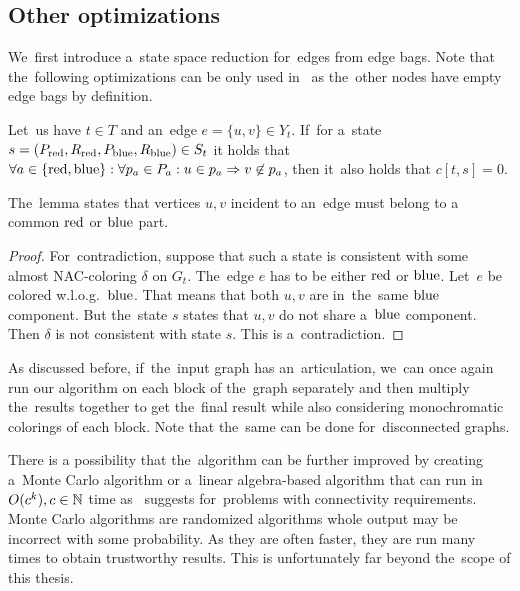 \subsection{Other optimizations}

We~first introduce a~state space reduction for~edges from edge bags.
%
Note that the~following optimizations can be only used in~\IntroduceEdgeNode{}
as the~other nodes have empty edge bags by definition.
%
\begin{lemma}
	Let~us have \( t \in T \) and an~edge \( e = \{u, v\} \in Y_t \).
	If~for a~state \( s = (P_{\text{red}}, R_{\text{red}}, P_{\text{blue}}, R_{\text{blue}}) \in S_t \)
	it holds that
	\( {\forall a \in \{\text{red}, \text{blue}\}} : {\forall p_a \in P_a} : {u \in p_a \Rightarrow v \not\in p_a} \),
	then it~also holds that \( c[t, s] = 0 \).
\end{lemma}
%
The~lemma states that vertices \( u, v \) incident to an~edge must
belong to a common \( \text{red} \) or \( \text{blue} \) part.
%
\begin{proof}
	For~contradiction, suppose that such a state is consistent
	with some almost NAC-coloring \( \delta \) on \( G_t \).
	The~edge \( e \) has to be either \( \text{red} \) or \( \text{blue} \).
	Let~\( e \) be colored w.l.o.g.\ \( \text{blue} \).
	That means that both \( u, v \) are in~the~same \( \text{blue} \) component.
	But the~state \( s \) states that \( u, v \) do not share a~\( \text{blue} \) component.
	Then \( \delta \) is not consistent with state \( s \).
	This is a~contradiction.
\end{proof}

As discussed before, if~the~input graph has an~articulation,
we~can once again run our algorithm on each block of the~graph separately
and then multiply the~results together to get the~final result
while also considering monochromatic colorings of each block.
Note that the~same can be done for~disconnected graphs.

There is a possibility that the~algorithm can be further improved by creating
a~Monte Carlo algorithm or a~linear algebra-based algorithm that can run
in~\( O(c^k), c \in \mathbb{N} \) time as~\cite{book_parametrized_algorithms} suggests
for~problems with connectivity requirements.
Monte Carlo algorithms are randomized algorithms whole output may be incorrect
with some probability. As they are often faster, they are run many times
to obtain trustworthy results.
This is unfortunately far beyond the~scope of this thesis.

